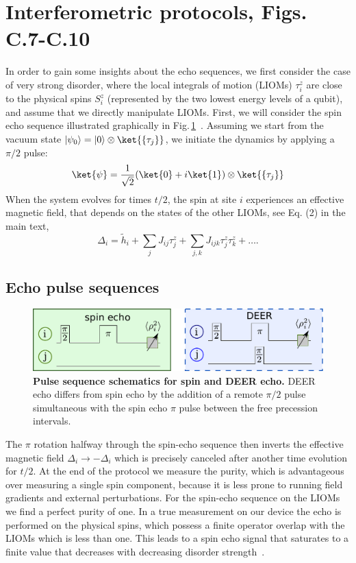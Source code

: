 \section{Interferometric protocols, Figs.\,C.7-C.10}
In order to gain some insights about the echo sequences, we first consider the case of very strong disorder, where the local integrals of motion (LIOMs) $\tau_i^z$ are close to the physical spins $S_i^z$ (represented by the two lowest energy levels of a qubit), and assume that we directly manipulate LIOMs. First, we will consider the spin echo sequence illustrated graphically in Fig.\,\ref{echo_pulse}~\cite{KnapPRL2014}.  Assuming we start from the vacuum state $\left|\psi_0\right> = \left| 0 \right>\otimes \ket{\{\tau_j\}} $, we initiate the dynamics by applying a $\pi/2$ pulse:
\begin{equation}
\ket{\psi} =\frac{1}{\sqrt{2}} (\ket{0} + i \ket{1}) \otimes \ket{\{\tau_j\}}
\end{equation}
When the system evolves for times $t/2$, the spin at site $i$ experiences an effective magnetic field, that depends on the states of the other LIOMs, see Eq. (2) in the main text,
\begin{equation}
\label{field}
\Delta_i = \tilde{h}_i  + \sum_j J_{ij} \tau_j^z + \sum_{j,k} J_{ijk}  \tau_j^z \tau_k^z + \ldots.
\end{equation}
\subsection{Echo pulse sequences}
\begin{figure}[h]
\centering
\includegraphics[width=.6\columnwidth]{./PDF/schem2}
\caption{\textbf{Pulse sequence schematics for spin and DEER echo.}  DEER echo differs from spin echo by the addition of a remote $\pi / 2$ pulse simultaneous with the spin echo $\pi$ pulse between the free precession intervals.}
\label{echo_pulse}
\end{figure}
The $\pi$ rotation halfway through the spin-echo sequence then inverts the effective magnetic field $\Delta_i \to -\Delta_i$ which is precisely canceled after another time evolution for $t/2$. At the end of the protocol we measure the purity, which is advantageous over measuring a single spin component, because it is less prone to running field gradients and external perturbations. For the spin-echo sequence on the LIOMs we find a perfect purity of one.
In a true measurement on our device the echo is performed on the physical spins, which possess a finite operator overlap with the LIOMs which is less than one. This leads to a spin echo signal that saturates to a finite value that decreases with decreasing disorder strength~\cite{KnapPRL2014}.

